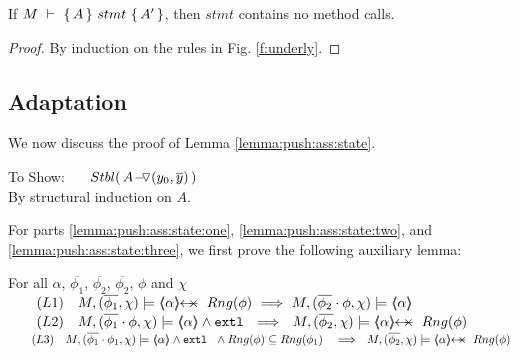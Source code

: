 
\begin{lemma}
\label{l:no:meth:calls}
If ${\hproves{M}  {A} {\ stmt\ }{A'} }$, then $stmt$ contains no method calls.
\end{lemma}

\begin{proof}
By induction on the rules in Fig. \ref{f:underly}.

\end{proof}

\subsection{Adaptation}
\label{appendix:adaptation}
 
 \newcommand{\SP}{$\strut \ \ \ \ $}


 We now discuss the proof of Lemma \ref{lemma:push:ass:state}.

 \vspace{0.5cm}
 
$~$ \\
To Show: \ \ \  $\Stable{\,  \PushASLong {(y_0,\overline y)} A\, }$
\\
By structural induction on $A$.\\
\completeProofSub

\vspace{1cm}

For parts \ref{lemma:push:ass:state:one},  \ref{lemma:push:ass:state:two}, and  \ref{lemma:push:ass:state:three}, we first prove the following auxiliary lemma:

\begin{auxLemma}
\label{l:push:pop:aux}
For all $\alpha$,   $\overline {\phi_1}$, $\overline {\phi_2}$, $\overline {\phi_2}$, $\phi$ and $\chi$\\
$\strut ~ \ \ \ \ \ (L1)\ \ \    M, (\overline {\phi_1},\chi) \models \protectedFrom \alpha {Rng(\phi)} \ \Longrightarrow \ M, (\overline {\phi_2}\cdot \phi,\chi) \models \inside \alpha$
\\
$\strut ~ \ \ \ \ \ (L2)\ \ \    M, (\overline {\phi_1}\cdot\phi,\chi) \models \inside \alpha   \wedge \extThis \ \ \Longrightarrow \ \ M, (\overline {\phi_2},\chi) \models \protectedFrom \alpha {Rng(\phi)} $\\
$\strut ~ \ \ \ \ \ (L3)\ \ \    M, (\overline {\phi_1}\cdot \phi_1,\chi) \models \inside \alpha   \wedge \extThis \ \ \wedge Rng(\phi)\subseteq Rng(\phi_1)\ \ \  \Longrightarrow \ \ M, (\overline {\phi_2},\chi) \models \protectedFrom \alpha {Rng(\phi)} $
\\\end{auxLemma}

